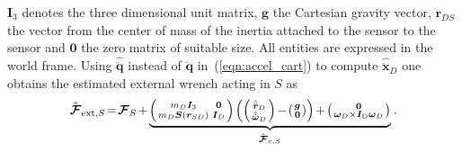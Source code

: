 \endgroup
%
$\bm{I}_3$ denotes the three dimensional unit matrix, $\bm{g}$ the Cartesian gravity vector, $\bm{r}_{DS}$ the vector from the center of mass of the inertia attached to the sensor to the sensor and $\bm{0}$ the zero matrix of suitable size.
All entities are expressed in the world frame.
Using $\hat{\ddot{\bm{q}}}$ instead of $\ddot{\bm{q}}$ in~(\ref{eqn:accel_cart}) to compute $\hat{\ddot{\bm{x}}}_D$ one obtains the estimated external wrench acting in $S$ as
%
\begin{equation}\small
\medmuskip=2mu
\thinmuskip=2mu
\thickmuskip=2mu
\hat{\bm{\mathcal{F}}}_{\mathrm{ext},S}=\bm{\mathcal{F}}_S+\underbrace{\left(\begin{smallmatrix}
m_D\bm{I}_3 & \bm{0}\\
m_D\bm{S}(\bm{r}_{SD}) & \bm{I}_{D}
\end{smallmatrix}\right)
\left(\left(\begin{smallmatrix}\hat{\ddot{\bm{r}}}_D\\\hat{\dot{\bm{\omega}}}_D\end{smallmatrix}\right)-\left(\begin{smallmatrix}
\bm{g}\\\bm{0}
\end{smallmatrix}\right)\right)+\left(\begin{smallmatrix}
\bm{0}\\
\bm{\omega}_D\times\bm{I}_\mathrm{D}\bm{\omega}_D
\end{smallmatrix}\right)}_{\hat{\bm{\mathcal{F}}}_{c,S}}\;.
\end{equation}
 
